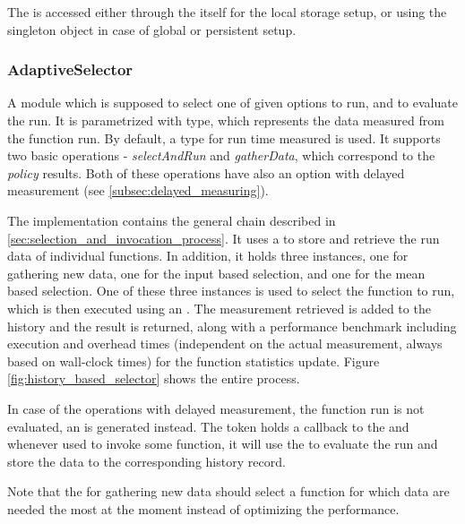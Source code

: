The  is accessed either through the  itself for the local storage setup, or using the singleton object  in case of global or persistent setup.

\subsubsection{AdaptiveSelector}

A module which is supposed to select one of given options to run, and to evaluate the run. It is parametrized with  type, which represents the data measured from the function run. By default, a  type for run time measured is used. It supports two basic operations - \textit{selectAndRun} and \textit{gatherData}, which correspond to the \textit{policy} results. Both of these operations have also an option with delayed measurement (see \ref{subsec:delayed_measuring}).

The implementation  contains the general chain described in \ref{sec:selection_and_invocation_process}. It uses a  to store and retrieve the run data of individual functions. In addition, it holds three  instances, one for gathering new data, one for the input based selection, and one for the mean based selection. One of these three instances is used to select the function to run, which is then executed using an . The measurement retrieved is added to the history and the result is returned, along with a performance benchmark including execution and overhead times (independent on the actual measurement, always based on wall-clock times) for the function statistics update. Figure \ref{fig:history_based_selector} shows the entire process.

In case of the operations with delayed measurement, the function run is not evaluated, an  is generated instead. The token holds a callback to the  and whenever used to invoke some function, it will use the  to evaluate the run and store the data to the corresponding history record.

Note that the  for gathering new data should select a function for which data are needed the most at the moment instead of optimizing the performance.

